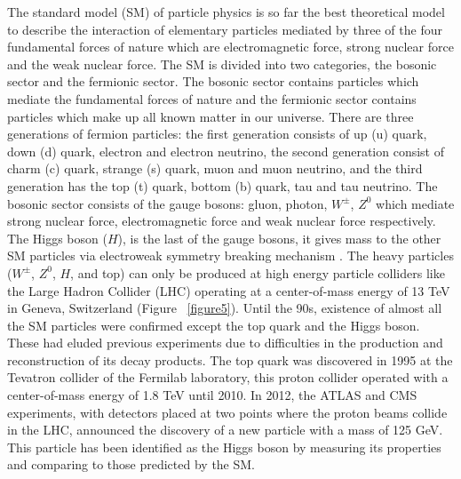 \documentclass[final,12pt]{article}
\begin{document}
The standard model (SM) of particle physics is so far the best theoretical model to describe the interaction of elementary particles mediated by three of the four fundamental forces of nature which are electromagnetic force, strong nuclear force and the weak nuclear force. The SM is divided into two categories, the bosonic sector and the fermionic sector.
The bosonic sector contains particles which mediate the fundamental forces of nature and the fermionic sector contains particles which make up all known matter in our universe.
There are three generations of fermion particles: the first generation consists of up (u) quark, down (d) quark, electron and electron neutrino, the second generation consist of charm (c) quark, strange (s) quark, muon and muon neutrino, and the third generation has the top (t) quark, bottom (b) quark, tau and tau neutrino.
The bosonic sector consists of the gauge bosons: gluon, photon, $W^{\pm}$, $Z^0$ which mediate strong nuclear force, electromagnetic force and weak nuclear force respectively.
The Higgs boson ($H$), is the last of the gauge bosons, it gives mass to the other SM particles via electroweak symmetry breaking mechanism \cite{Chatrchyan:2012xdj}.
The heavy particles ($W^{\pm}$, $Z^0$, $H$, and top) can only be produced at high energy particle colliders like the Large Hadron Collider (LHC) operating at a center-of-mass energy of 13 TeV in Geneva, Switzerland (Figure ~\ref{figure5}).
Until the 90s, existence of almost all the SM particles were confirmed except the top quark and the Higgs boson. 
These had eluded previous experiments due to difficulties in the production and reconstruction of its decay products.
The top quark was discovered in 1995 at the Tevatron collider of the Fermilab laboratory, this proton collider operated with a center-of-mass energy of 1.8 TeV until 2010.
In 2012, the ATLAS and CMS experiments, with detectors placed at two points where the proton beams collide in the LHC, announced the discovery of a new particle with a mass of 125 GeV.
This particle has been identified as the Higgs boson by measuring its properties and comparing to those predicted by the SM.
\end{document}
